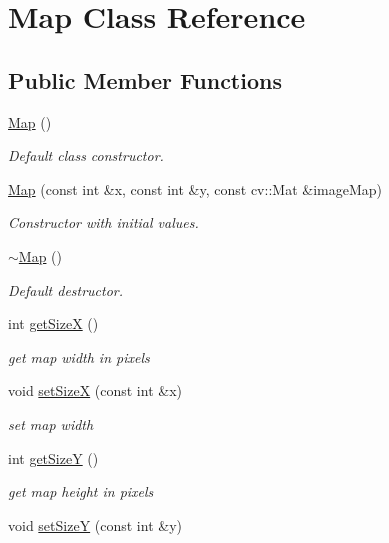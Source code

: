 \hypertarget{classMap}{}\section{Map Class Reference}
\label{classMap}
\subsection*{Public Member Functions}
\begin{DoxyCompactItemize}
\item 
\mbox{\hyperlink{classMap_a0f5ad0fd4563497b4214038cbca8b582}{Map}} ()
\begin{DoxyCompactList}\small\item\em Default class constructor. \end{DoxyCompactList}\item 
\mbox{\hyperlink{classMap_a57ace230b27f1782023c08bce3e9f97a}{Map}} (const int \&x, const int \&y, const cv\+::\+Mat \&image\+Map)
\begin{DoxyCompactList}\small\item\em Constructor with initial values. \end{DoxyCompactList}\item 
\mbox{\hyperlink{classMap_aa403fbe09394ccf39747588f5168e3b2}{$\sim$\+Map}} ()
\begin{DoxyCompactList}\small\item\em Default destructor. \end{DoxyCompactList}\item 
int \mbox{\hyperlink{classMap_a8f98d27258db448abb49b93be0d8149f}{get\+SizeX}} ()
\begin{DoxyCompactList}\small\item\em get map width in pixels \end{DoxyCompactList}\item 
void \mbox{\hyperlink{classMap_a30b60d97e3738f517c4c50241798a4f5}{set\+SizeX}} (const int \&x)
\begin{DoxyCompactList}\small\item\em set map width \end{DoxyCompactList}\item 
int \mbox{\hyperlink{classMap_a910e3822a911ba31cdc4d0d9d722b5a0}{get\+SizeY}} ()
\begin{DoxyCompactList}\small\item\em get map height in pixels \end{DoxyCompactList}\item 
void \mbox{\hyperlink{classMap_a3dfcc361c0ed20779beaedbe15aea191}{set\+SizeY}} (const int \&y)

\end{DoxyCompactItemize}

